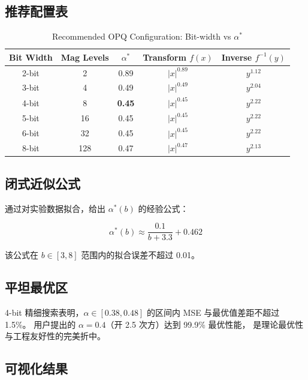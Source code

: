 \documentclass[11pt,a4paper]{article}
\begin{document}
\subsection{推荐配置表}

\begin{table}[h]
\centering
\caption{Recommended OPQ Configuration: Bit-width vs $\alpha^*$}
\label{tab:opq_config}
\begin{tabular}{c|c|c|c|c}
\hline
Bit Width & Mag Levels & $\alpha^*$ & Transform $f(x)$ & Inverse $f^{-1}(y)$ \\
\hline
2-bit & 2 & 0.89 & $|x|^{0.89}$ & $y^{1.12}$ \\
3-bit & 4 & 0.49 & $|x|^{0.49}$ & $y^{2.04}$ \\
4-bit & 8 & \textbf{0.45} & $|x|^{0.45}$ & $y^{2.22}$ \\
5-bit & 16 & 0.45 & $|x|^{0.45}$ & $y^{2.22}$ \\
6-bit & 32 & 0.45 & $|x|^{0.45}$ & $y^{2.22}$ \\
8-bit & 128 & 0.47 & $|x|^{0.47}$ & $y^{2.13}$ \\
\hline
\end{tabular}
\end{table}

\subsection{闭式近似公式}

通过对实验数据拟合，给出 $\alpha^*(b)$ 的经验公式：

\begin{equation}
\boxed{\alpha^*(b) \approx \frac{0.1}{b + 3.3} + 0.462}
\label{eq:alpha_star}
\end{equation}

该公式在 $b \in [3, 8]$ 范围内的拟合误差不超过 0.01。

\subsection{平坦最优区}

4-bit 精细搜索表明，$\alpha \in [0.38, 0.48]$ 的区间内 MSE 与最优值差距不超过 1.5\%。
用户提出的 $\alpha = 0.4$（开 2.5 次方）达到 99.9\% 最优性能，
是理论最优性与工程友好性的完美折中。

\subsection{可视化结果}
\end{document}
